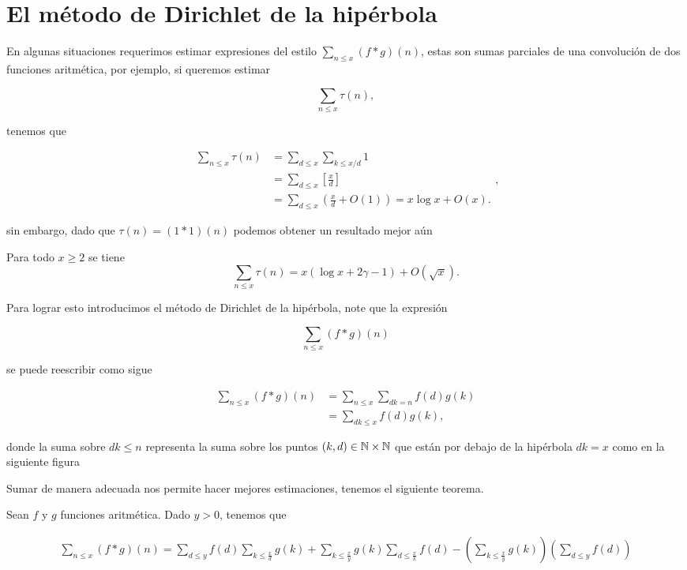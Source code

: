 \section{El método de Dirichlet de la hipérbola}

En algunas situaciones requerimos estimar expresiones del estilo $\displaystyle\sum_{n\leq x}(f*g)(n)$, estas son sumas parciales de una convolución de dos funciones aritmética, por ejemplo, si queremos estimar

$$\sum_{n\leq x} \tau(n),$$

tenemos que 

$$
\begin{aligned}
\sum_{n \leqslant x} \tau(n) & =\sum_{d \leqslant x} \sum_{k \leqslant x / d} 1 \\
& =\sum_{d \leqslant x}\left[\frac{x}{d}\right] \\
& =\sum_{d \leqslant x}\left(\frac{x}{d}+O(1)\right)=x \log x+O(x) .
\end{aligned},
$$

sin embargo, dado que $\tau(n)=(1*1)(n)$ podemos obtener un resultado mejor aún

\begin{theorem}[Dirichlet]
Para todo $x \geq 2$  se tiene \\
$$\sum_{n \leqslant x} \tau(n)=x(\log x+2 \gamma-1)+O(\sqrt{x}).$$
\end{theorem}

Para lograr esto introducimos el método de Dirichlet de la hipérbola, note que la expresión

$$\sum_{n\leq x}(f*g)(n)$$

se puede reescribir como sigue

\begin{align*}
    \sum_{n\leq x}(f*g)(n)&=\sum_{n\leq x}\sum_{dk= n}f(d)g\left(k\right)\\
    &=\sum_{dk\leq x} f(d)g(k)
,\end{align*}

donde la suma sobre $dk\leq n$ representa la suma sobre los puntos $(k,d)\in \mathbb{N}\times\mathbb{N}$ que están por debajo de la hipérbola $dk=x$ como en la siguiente figura


\begin{center}

\end{center}

Sumar de manera adecuada nos permite hacer mejores estimaciones, tenemos el siguiente teorema.


\begin{theorem}
 Sean $f$ y $g$ funciones aritmética. Dado $y>0$, tenemos que

$$
\begin{aligned}
\sum_{n \leq x}(f * g)(n)= \sum_{d \leq y} f(d) \sum_{k \leq \frac{x}{d}} g(k)+\sum_{k \leq \frac{x}{y}} g(k) \sum_{d \leq \frac{x}{k}} f(d)-\left(\sum_{k \leq \frac{x}{y}} g(k)\right)\left(\sum_{d \leq y} f(d)\right)
\end{aligned}
$$
\end{theorem}

